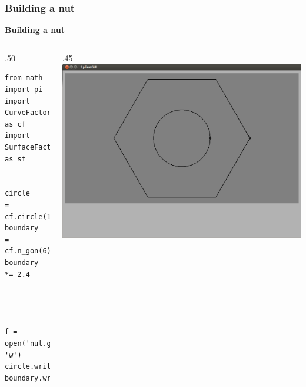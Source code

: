 \documentclass{beamer}
\theoremstyle{plain}
\theoremstyle{definition}
\begin{document}
\begin{frame}[fragile]
\frametitle{Building a nut}
\textbf{Building a nut}

\begin{columns}
    \begin{column}{.50\linewidth}
        \begin{listing}[H]
            \tiny
            \begin{verbatim}
from math import pi
import CurveFactory   as cf
import SurfaceFactory as sf


circle    = cf.circle(1.0)
boundary  = cf.n_gon(6)
boundary *= 2.4




f = open('nut.g2', 'w')
circle.write_g2(f)
boundary.write_g2(f)
            \end{verbatim}
        \end{listing}
    \end{column}
    \begin{column}{.45\linewidth}
        \includegraphics[width=\linewidth]{nut1}
    \end{column}
\end{columns}

\end{frame}

\end{document}
